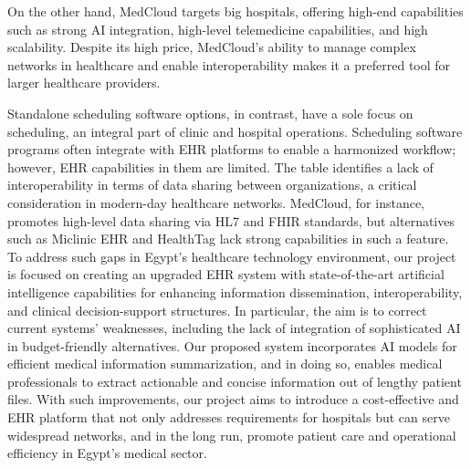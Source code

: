 On the other hand, MedCloud targets big hospitals, offering high-end capabilities such as strong AI integration, high-level telemedicine capabilities, and high scalability. Despite its high price, MedCloud's ability to manage complex networks in healthcare and enable interoperability makes it a preferred tool for larger healthcare providers.

Standalone scheduling software options, in contrast, have a sole focus on scheduling, an integral part of clinic and hospital operations. Scheduling software programs often integrate with EHR platforms to enable a harmonized workflow; however, EHR capabilities in them are limited. The table identifies a lack of interoperability in terms of data sharing between organizations, a critical consideration in modern-day healthcare networks. MedCloud, for instance, promotes high-level data sharing via HL7 and FHIR standards, but alternatives such as Miclinic EHR and HealthTag lack strong capabilities in such a feature.
To address such gaps in Egypt's healthcare technology environment, our project is focused on creating an upgraded EHR system with state-of-the-art artificial intelligence capabilities for enhancing information dissemination, interoperability, and clinical decision-support structures. In particular, the aim is to correct current systems' weaknesses, including the lack of integration of sophisticated AI in budget-friendly alternatives. Our proposed system incorporates AI models for efficient medical information summarization, and in doing so, enables medical professionals to extract actionable and concise information out of lengthy patient files. With such improvements, our project aims to introduce a cost-effective and EHR platform that not only addresses requirements for hospitals but can serve widespread networks, and in the long run, promote patient care and operational efficiency in Egypt's medical sector.